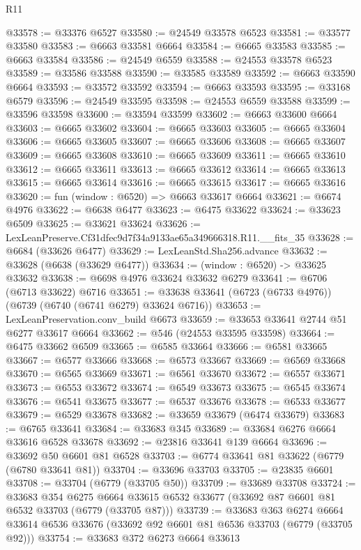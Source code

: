 \begin{lexlean}{R11}
\begin{coremodule}
@33578 := @33376 @6527
@33580 := @24549 @33578 @6523
@33581 := @33577 @33580
@33583 := @6663 @33581 @6664
@33584 := @6665 @33583
@33585 := @6663 @33584
@33586 := @24549 @6559
@33588 := @24553 @33578 @6523
@33589 := @33586 @33588
@33590 := @33585 @33589
@33592 := @6663 @33590 @6664
@33593 := @33572 @33592
@33594 := @6663 @33593
@33595 := @33168 @6579
@33596 := @24549 @33595
@33598 := @24553 @6559 @33588
@33599 := @33596 @33598
@33600 := @33594 @33599
@33602 := @6663 @33600 @6664
@33603 := @6665 @33602
@33604 := @6665 @33603
@33605 := @6665 @33604
@33606 := @6665 @33605
@33607 := @6665 @33606
@33608 := @6665 @33607
@33609 := @6665 @33608
@33610 := @6665 @33609
@33611 := @6665 @33610
@33612 := @6665 @33611
@33613 := @6665 @33612
@33614 := @6665 @33613
@33615 := @6665 @33614
@33616 := @6665 @33615
@33617 := @6665 @33616
@33620 := fun (window : @6520) => @6663 @33617 @6664
@33621 := @6674 @4976
@33622 := @6638 @6477
@33623 := @6475 @33622
@33624 := @33623 @6509
@33625 := @33621 @33624
@33626 := LexLeanPreserve.Cf31dfec9d7f34a9133ae65a349666318.R11.__fits_35
@33628 := @6684 (@33626 @6477)
@33629 := LexLeanStd.Sha256.advance
@33632 := @33628 (@6638 (@33629 @6477))
@33634 := (window : @6520) -> @33625 @33632
@33638 := @6698 @4976 @33624 @33632 @6279
@33641 := @6706 (@6713 @33622) @6716
@33651 := @33638 @33641 (@6723 (@6733 @4976)) (@6739 (@6740 (@6741 @6279) @33624 @6716))
@33653 := LexLeanPreservation.conv_build @6673
@33659 := @33653 @33641 @2744 @51 @6277 @33617 @6664
@33662 := @546 (@24553 @33595 @33598)
@33664 := @6475 @33662 @6509
@33665 := @6585 @33664
@33666 := @6581 @33665
@33667 := @6577 @33666
@33668 := @6573 @33667
@33669 := @6569 @33668
@33670 := @6565 @33669
@33671 := @6561 @33670
@33672 := @6557 @33671
@33673 := @6553 @33672
@33674 := @6549 @33673
@33675 := @6545 @33674
@33676 := @6541 @33675
@33677 := @6537 @33676
@33678 := @6533 @33677
@33679 := @6529 @33678
@33682 := @33659 @33679 (@6474 @33679)
@33683 := @6765 @33641
@33684 := @33683 @345
@33689 := @33684 @6276 @6664 @33616 @6528 @33678
@33692 := @23816 @33641 @139 @6664
@33696 := @33692 @50 @6601 @81 @6528
@33703 := @6774 @33641 @81 @33622 (@6779 (@6780 @33641 @81))
@33704 := @33696 @33703
@33705 := @23835 @6601
@33708 := @33704 (@6779 (@33705 @50))
@33709 := @33689 @33708
@33724 := @33683
    @354
    @6275
    @6664
    @33615
    @6532
    @33677
    (@33692 @87 @6601 @81 @6532 @33703 (@6779 (@33705 @87)))
@33739 := @33683
    @363
    @6274
    @6664
    @33614
    @6536
    @33676
    (@33692 @92 @6601 @81 @6536 @33703 (@6779 (@33705 @92)))
@33754 := @33683
    @372
    @6273
    @6664
    @33613

\end{coremodule}
\end{lexlean}
